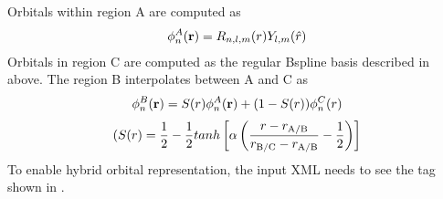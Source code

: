 \documentclass[letterpaper,10pt,english]{sphinxmanual}
\begin{document}
Orbitals within region A are computed as
\begin{equation*}
\begin{split}\phi^A_n({\bf r})=R_{n,l,m}(r)Y_{l,m}(\hat{r})\end{split}
\end{equation*}
Orbitals in region C are computed as the regular B\sphinxhyphen{}spline basis described in {\hyperref[\detokenize{intro_wavefunction:spo-spline}]{}} above. The region B interpolates between A and C as
\begin{equation}\label{equation:intro_wavefunction:eq6}
\begin{split}\phi^B_n({\bf r}) = S(r) \phi^A_n({\bf r}) + (1-S(r))\phi^C_n(r)\end{split}
\end{equation}\begin{equation}\label{equation:intro_wavefunction:eq7}
\begin{split}(S(r) = \frac{1}{2}-\frac{1}{2} tanh \left[\alpha\left(\frac{r-r_{\rm A/B}}{r_{\rm B/C}-r_{\rm A/B}}-\frac{1}{2}\right)\right]\end{split}
\end{equation}
To enable hybrid orbital representation, the input XML needs to see the tag  shown in {\hyperref[\detokenize{intro_wavefunction:listing-6}]{}}.
\def\sphinxLiteralBlockLabel{\label{\detokenize{intro_wavefunction:listing-6}}}
\begin{sphinxVerbatim}[commandchars=\\\{\}]
   
                 
                
\end{sphinxVerbatim}
\end{document}
